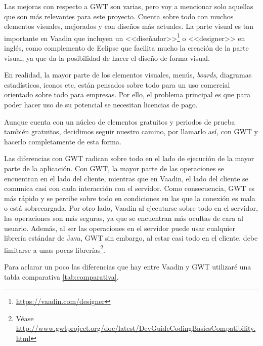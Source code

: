 Las mejoras con respecto a GWT son varias, pero voy a mencionar solo aquellas que son más relevantes para este proyecto. Cuenta sobre todo con muchos elementos visuales, mejorados y con diseños más actuales. La parte visual es tan importante en Vaadin que incluyen un <<diseñador>>\footnote{\url{https://vaadin.com/designer}} o <<designer>> en inglés, como complemento de Eclipse que facilita mucho la creación de la parte visual, ya que da la posibilidad de hacer el diseño de forma visual.

En realidad, la mayor parte de los elementos visuales, menús, \emph{boards}, diagramas estadísticos, iconos etc, están pensados sobre todo para un uso comercial orientado sobre todo para empresas. Por ello, el problema principal es que para poder hacer uso de su potencial se necesitan licencias de pago.

Aunque cuenta con un núcleo de elementos gratuitos y periodos de prueba también gratuitos, decidimos seguir nuestro camino, por llamarlo así, con GWT y hacerlo completamente de esta forma.

Las diferencias con GWT radican sobre todo en el lado de ejecución de la mayor parte de la aplicación. Con GWT, la mayor parte de las operaciones se encuentran en el lado del cliente, mientras que en Vaadin, el lado del cliente se comunica casi con cada interacción con el servidor. Como consecuencia, GWT es más rápido y se percibe sobre todo en condiciones en las que la conexión es mala o está sobrecargada. Por otro lado, Vaadin al ejecutarse sobre todo en el servidor, las operaciones son más seguras, ya que se encuentran más ocultas de cara al usuario. Además, al ser las operaciones en el servidor puede usar cualquier librería estándar de Java, GWT sin embargo, al estar casi todo en el cliente, debe limitarse a unas pocas librerías\footnote{Véase \url{http://www.gwtproject.org/doc/latest/DevGuideCodingBasicsCompatibility.html}}.

Para aclarar un poco las diferencias que hay entre Vaadin y GWT utilizaré una tabla comparativa \ref{tab:comparativa}.



